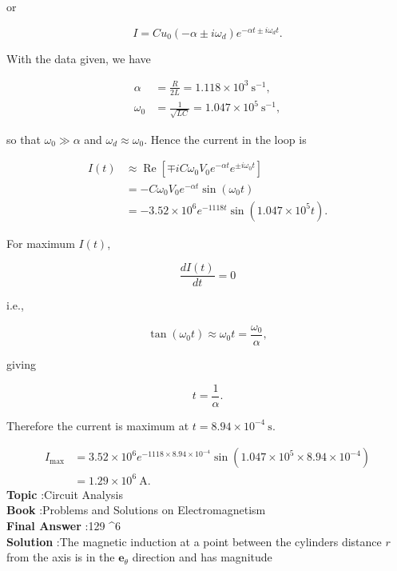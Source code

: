 \documentclass[10pt]{article}
\begin{document}
or

$$
I=C u_{0}\left(-\alpha \pm i \omega_{d}\right) e^{-\alpha t \pm i \omega_{d} t} .
$$

With the data given, we have

$$
\begin{aligned}
\alpha &=\frac{R}{2 L}=1.118 \times 10^{3} \mathrm{~s}^{-1}, \\
\omega_{0} &=\frac{1}{\sqrt{L C}}=1.047 \times 10^{5} \mathrm{~s}^{-1},
\end{aligned}
$$

so that $\omega_{0} \gg \alpha$ and $\omega_{d} \approx \omega_{0}$. Hence the current in the loop is

$$
\begin{aligned}
I(t) & \approx \operatorname{Re}\left[\mp i C \omega_{0} V_{0} e^{-\alpha t} e^{\pm i \omega_{0} t}\right] \\
&=-C \omega_{0} V_{0} e^{-\alpha t} \sin \left(\omega_{0} t\right) \\
&=-3.52 \times 10^{6} e^{-1118 t} \sin \left(1.047 \times 10^{5} t\right) .
\end{aligned}
$$

For maximum $I(t)$,

$$
\frac{d I(t)}{d t}=0
$$

i.e.,

$$
\tan \left(\omega_{0} t\right) \approx \omega_{0} t=\frac{\omega_{0}}{\alpha},
$$

giving

$$
t=\frac{1}{\alpha} .
$$

Therefore the current is maximum at $t=8.94 \times 10^{-4} \mathrm{~s}$.



$$
\begin{aligned}
I_{\max } &=3.52 \times 10^{6} e^{-1118 \times 8.94 \times 10^{-4}} \sin \left(1.047 \times 10^{5} \times 8.94 \times 10^{-4}\right) \\
&=1.29 \times 10^{6} \mathrm{~A} .
\end{aligned}
$$
\textbf{Topic} :Circuit Analysis\\
\textbf{Book} :Problems and Solutions on Electromagnetism\\
\textbf{Final Answer} :129 ^{6} \\


\textbf{Solution} :The magnetic induction at a point between the cylinders distance $r$ from the axis is in the $\mathbf{e}_{\theta}$ direction and has magnitude
\end{document}

